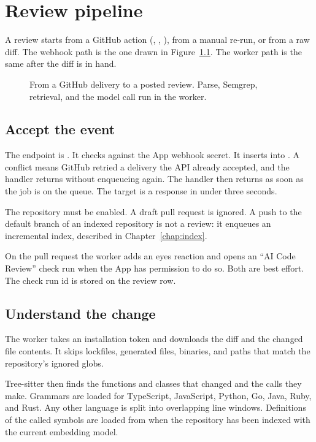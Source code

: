 \chapter{Review pipeline}
\label{chap:pipeline}

A review starts from a GitHub  action (, , ), from a manual re-run, or from a raw diff. The webhook path is the one drawn in Figure~\ref{fig:review-flow}. The worker path is the same after the diff is in hand.

\begin{figure}[H]
  \centering
  \resizebox{\linewidth}{!}{}
  \caption{From a GitHub delivery to a posted review. Parse, Semgrep, retrieval, and the model call run in the worker.}
  \label{fig:review-flow}
\end{figure}

\section{Accept the event}

The endpoint is . It checks  against the App webhook secret. It inserts  into . A conflict means GitHub retried a delivery the API already accepted, and the handler returns without enqueueing again. The handler then returns as soon as the job is on the queue. The target is a response in under three seconds.

The repository must be enabled. A draft pull request is ignored. A push to the default branch of an indexed repository is not a review: it enqueues an incremental index, described in Chapter~\ref{chap:index}.

On the pull request the worker adds an eyes reaction and opens an ``AI Code Review'' check run when the App has permission to do so. Both are best effort. The check run id is stored on the review row.

\section{Understand the change}

The worker takes an installation token and downloads the diff and the changed file contents. It skips lockfiles, generated files, binaries, and paths that match the repository's ignored globs.

Tree-sitter then finds the functions and classes that changed and the calls they make. Grammars are loaded for TypeScript, JavaScript, Python, Go, Java, Ruby, and Rust. Any other language is split into overlapping line windows. Definitions of the called symbols are loaded from  when the repository has been indexed with the current embedding model.

